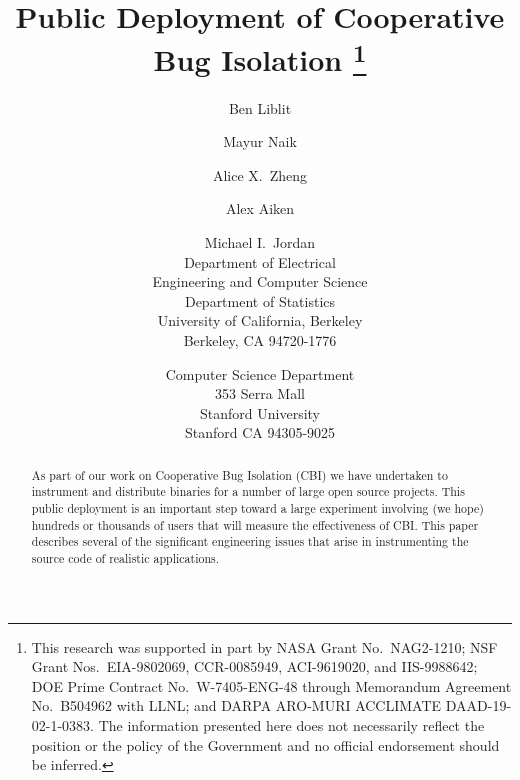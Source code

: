 \documentclass[10pt,twocolumn]{article}
\begin{document}
\title{Public Deployment of Cooperative Bug Isolation
  \thanks{This research was supported in part by NASA Grant No.\ 
    NAG2-1210; NSF Grant Nos.\ EIA-9802069, CCR-0085949, ACI-9619020,
    and IIS-9988642; DOE Prime Contract No.\ W-7405-ENG-48 through
    Memorandum Agreement No.\ B504962 with LLNL; and DARPA ARO-MURI
    ACCLIMATE DAAD-19-02-1-0383.  The information presented here does
    not necessarily reflect the position or the policy of the
    Government and no official endorsement should be inferred.}}

\author{%
  Ben Liblit \eecs \\  \and
  Mayur Naik \stan \\  \and
  Alice X.\ Zheng \eecs \\  \and
  Alex Aiken \stan \\  \and
  Michael I.\ Jordan \both \\ 
  \aupar
  \eecs Department of Electrical \\ Engineering and Computer Science \\
  \stat Department of Statistics \\
  University of California, Berkeley \\
  Berkeley, CA 94720-1776
  \and
  \stan Computer Science Department \\
  353 Serra Mall \\
  Stanford University \\
  Stanford CA 94305-9025
}

\maketitle

\thispagestyle{empty}

\begin{abstract}
  As part of our work on Cooperative Bug Isolation (CBI) we have
  undertaken to instrument and distribute binaries for a number of
  large open source projects.  This public deployment is an important
  step toward a large experiment involving (we hope) hundreds or
  thousands of users that will measure the effectiveness of CBI\@.
  This paper describes several of the significant engineering issues
  that arise in instrumenting the source code of realistic
  applications.
\end{abstract}
\end{document}
